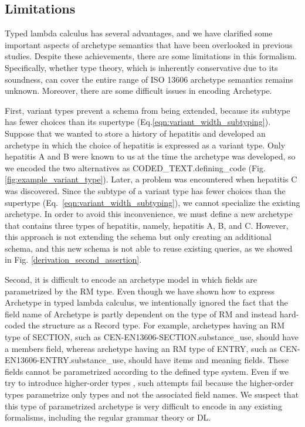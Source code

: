\documentclass[preprint,3p,onecolumn,times,review]{elsarticle}
\begin{document}
\subsection{Limitations}

Typed lambda calculus has several advantages, and we have clarified some important aspects of archetype semantics that have been overlooked in previous studies. Despite these achievements, there are some limitations in this formalism. Specifically, whether type theory, which is inherently conservative due to its soundness, can cover the entire range of ISO 13606 archetype semantics remains unknown. Moreover, there are some difficult issues in encoding Archetype.

First, variant types prevent a schema from being extended, because its subtype has fewer choices than its supertype (Eq.\ref{eqn:variant_width_subtyping}). Suppose that we wanted to store a history of hepatitis and developed an archetype in which the choice of hepatitis is expressed as a variant type. Only hepatitis A and B were known to us at the time the archetype was developed, so we encoded the two alternatives as CODED\_TEXT.defining\_code (Fig. \ref{fig:example_variant_type}). Later, a problem was encountered when hepatitis C was discovered. Since the subtype of a variant type has fewer choices than the supertype (Eq.~\ref{eqn:variant_width_subtyping}), we cannot specialize the existing archetype. In order to avoid this inconvenience, we must define a new archetype that contains three types of hepatitis, namely, hepatitis A, B, and C. However, this approach is not extending the schema but only creating an additional schema, and this new schema is not able to reuse existing queries, as we showed in Fig. \ref{derivation_second_assertion}.

Second, it is difficult to encode an archetype model in which fields are parametrized by the RM type.
Even though we have shown how to express Archetype in typed lambda calculus, we intentionally ignored the fact that the field name of Archetype is partly dependent on the type of RM \cite[p.63]{iso08:13606_healt_elect_part2} and instead hard-coded the structure as a Record type.
For example, archetypes having an RM type of SECTION, such as CEN-EN13606-SECTION.substance\_use, should have a members field, whereas archetype having an RM type of ENTRY, such as CEN-EN13606-ENTRY.substance\_use, should have items and meaning fields. These fields cannot be parametrized according to the defined type system. Even if we try to introduce higher-order types \cite[p.24]{cardelli04:_type_system}, such attempts fail because the higher-order types parametrize only types and not the associated field names. We suspect that this type of parametrized archetype is very difficult to encode in any existing formalisms, including the regular grammar theory or DL.
  
\end{document}
